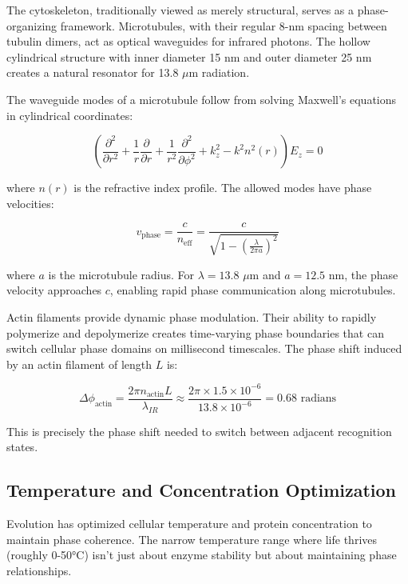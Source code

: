 \documentclass[12pt,a4paper]{report}
\begin{document}
The cytoskeleton, traditionally viewed as merely structural, serves as a phase-organizing framework. Microtubules, with their regular 8-nm spacing between tubulin dimers, act as optical waveguides for infrared photons. The hollow cylindrical structure with inner diameter 15 nm and outer diameter 25 nm creates a natural resonator for 13.8 $\mu$m radiation.

The waveguide modes of a microtubule follow from solving Maxwell's equations in cylindrical coordinates:

\begin{equation}
\left(\frac{\partial^2}{\partial r^2} + \frac{1}{r} \frac{\partial}{\partial r} + \frac{1}{r^2} \frac{\partial^2}{\partial \phi^2} + k_z^2 - k^2 n^2(r)\right) E_z = 0
\end{equation}

where $n(r)$ is the refractive index profile. The allowed modes have phase velocities:

\begin{equation}
v_{\text{phase}} = \frac{c}{n_{\text{eff}}} = \frac{c}{\sqrt{1 - \left(\frac{\lambda}{2\pi a}\right)^2}}
\end{equation}

where $a$ is the microtubule radius. For $\lambda = 13.8$ $\mu$m and $a = 12.5$ nm, the phase velocity approaches $c$, enabling rapid phase communication along microtubules.

Actin filaments provide dynamic phase modulation. Their ability to rapidly polymerize and depolymerize creates time-varying phase boundaries that can switch cellular phase domains on millisecond timescales. The phase shift induced by an actin filament of length $L$ is:

\begin{equation}
\Delta\phi_{\text{actin}} = \frac{2\pi n_{\text{actin}} L}{\lambda_{IR}} \approx \frac{2\pi \times 1.5 \times 10^{-6}}{13.8 \times 10^{-6}} = 0.68 \text{ radians}
\end{equation}

This is precisely the phase shift needed to switch between adjacent recognition states.

\subsection{Temperature and Concentration Optimization}

Evolution has optimized cellular temperature and protein concentration to maintain phase coherence. The narrow temperature range where life thrives (roughly 0-50°C) isn't just about enzyme stability but about maintaining phase relationships.
\end{document}
